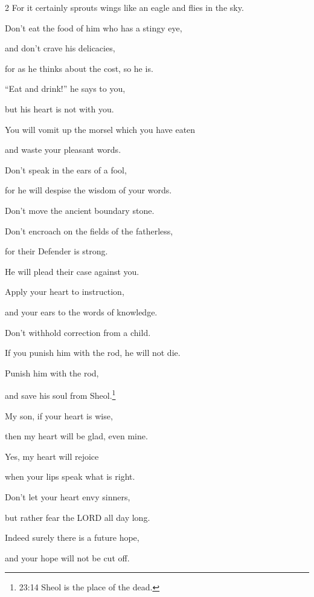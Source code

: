 \begin{multicols}{2}
For it certainly sprouts wings like an eagle and flies in the sky.


\myverse{}Don’t eat the food of him who has a stingy eye,

and don’t crave his delicacies,


\myverse{}for as he thinks about the cost, so he is.

“Eat and drink!” he says to you,

but his heart is not with you.


\myverse{}You will vomit up the morsel which you have eaten

and waste your pleasant words.


\vspace{\baselineskip} 
\myverse{}Don’t speak in the ears of a fool,

for he will despise the wisdom of your words.


\vspace{\baselineskip} 
\myverse{}Don’t move the ancient boundary stone.

Don’t encroach on the fields of the fatherless,


\myverse{}for their Defender is strong.

He will plead their case against you.


\vspace{\baselineskip} 
\myverse{}Apply your heart to instruction,

and your ears to the words of knowledge.


\myverse{}Don’t withhold correction from a child.

If you punish him with the rod, he will not die.


\myverse{}Punish him with the rod,

and save his soul from Sheol.\footnote{23:14 Sheol is the place of the dead.}


\vspace{\baselineskip} 
\myverse{}My son, if your heart is wise,

then my heart will be glad, even mine.


\myverse{}Yes, my heart will rejoice

when your lips speak what is right.


\myverse{}Don’t let your heart envy sinners,

but rather fear the LORD all day long.


\myverse{}Indeed surely there is a future hope,

and your hope will not be cut off.



\end{multicols}
